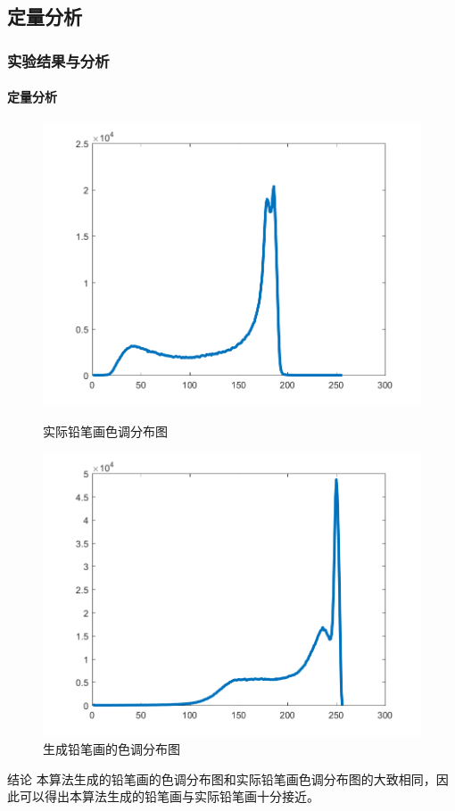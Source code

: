 \documentclass[aspectratio=43, xcolor=svgnames, t, 10pt]{beamer}
\begin{document}
\subsection{定量分析}
\begin{frame}
        \frametitle{实验结果与分析}
        \framesubtitle{定量分析}
        \begin{figure}[!h]
          \centering
          \begin{minipage}[t]{0.45\linewidth}
            \centering
            \includegraphics[width=1\linewidth]{./figure/sketch_hist-01.png}
            \caption{实际铅笔画色调分布图}
          \end{minipage}
          \hspace{5ex}
          \begin{minipage}[t]{0.45\linewidth}
            \centering
            \includegraphics[width=1\linewidth]{./figure/thesis_hist-01.png}
            \caption{生成铅笔画的色调分布图}
          \end{minipage}
        \end{figure}
        \begin{block}{结论}
          本算法生成的铅笔画的色调分布图和实际铅笔画色调分布图的大致相同，因此可以得出本算法生成的铅笔画与实际铅笔画十分接近。
        \end{block}
\end{frame}
\end{document}
